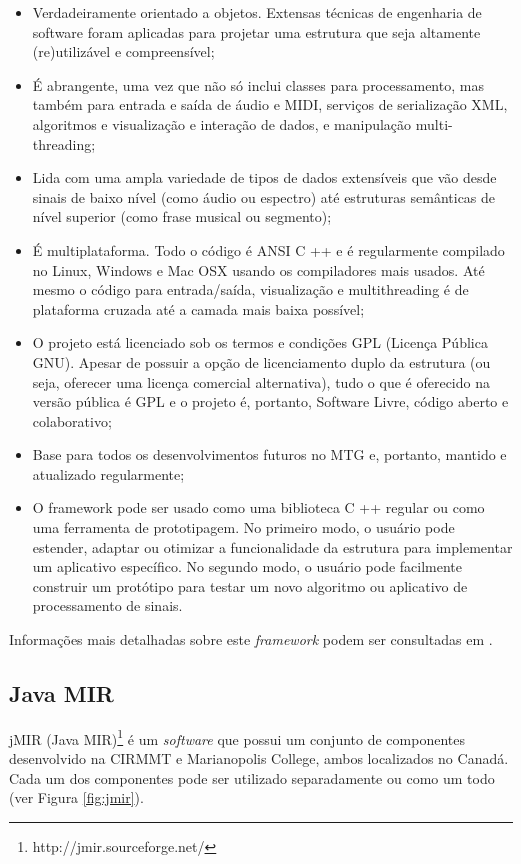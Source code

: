 \begin{itemize}
    \item Verdadeiramente orientado a objetos. Extensas técnicas de engenharia de software foram aplicadas para projetar uma estrutura que seja altamente (re)utilizável e compreensível;
    \item É abrangente, uma vez que não só inclui classes para processamento, mas também para entrada e saída de áudio e MIDI, serviços de serialização XML, algoritmos e visualização e interação de dados, e manipulação multi-threading;
    \item Lida com uma ampla variedade de tipos de dados extensíveis que vão desde sinais de baixo nível (como áudio ou espectro) até estruturas semânticas de nível superior (como frase musical ou segmento);
    \item É multiplataforma. Todo o código é ANSI C ++ e é regularmente compilado no Linux, Windows e Mac OSX usando os compiladores mais usados. Até mesmo o código para entrada/saída, visualização e multithreading é de plataforma cruzada até a camada mais baixa possível;
    \item O projeto está licenciado sob os termos e condições GPL (Licença Pública GNU). Apesar de possuir a opção de licenciamento duplo da estrutura (ou seja, oferecer uma licença comercial alternativa), tudo o que é oferecido na versão pública é GPL e o projeto é, portanto, Software Livre, código aberto e colaborativo;
    \item Base para todos os desenvolvimentos futuros no MTG e, portanto, mantido e atualizado regularmente;
    \item O framework pode ser usado como uma biblioteca C ++ regular ou como uma ferramenta de prototipagem. No primeiro modo, o usuário pode estender, adaptar ou otimizar a funcionalidade da estrutura para implementar um aplicativo específico. No segundo modo, o usuário pode facilmente construir um protótipo para testar um novo algoritmo ou aplicativo de processamento de sinais.
\end{itemize}

Informações mais detalhadas sobre este \textit{framework} podem ser consultadas em \cite{amatriain2007, amatriain2004}.

\subsection{Java MIR} \label{subsec:jmir}
jMIR (Java MIR)\footnote{http://jmir.sourceforge.net/} é um \textit{software} que possui um conjunto de componentes desenvolvido na CIRMMT e Marianopolis College, ambos localizados no Canadá. Cada um dos componentes pode ser utilizado separadamente ou como um todo (ver Figura \ref{fig:jmir}).

